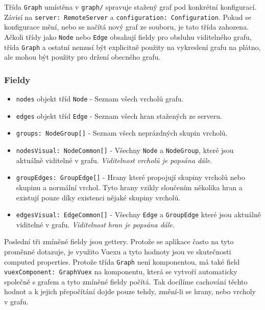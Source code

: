 Třída \texttt{Graph} umístěna v \texttt{graph/} spravuje stažený graf pod konkrétní konfigurací. Závisí na \texttt{server: RemoteServer} a \texttt{configuration: Configuration}. Pokud se konfigurace mění, nebo se načítá nový graf ze souboru, je tato třída zahozena. Ačkoli třídy jako \texttt{Node} nebo \texttt{Edge} obsahují fieldy pro obsluhu viditelného grafu, třída \texttt{Graph} a ostatní nemusí být explicitně použity na vykreslení grafu na plátno, ale mohou být použity pro držení obecného grafu.

\subsubsection*{Fieldy}
\begin{itemize}
  \item \texttt{nodes} objekt tříd \texttt{Node} - Seznam všech vrcholů grafu.
  \item \texttt{edges} objekt tříd \texttt{Edge} - Seznam všech hran stažených ze serveru.
  \item \texttt{groups: NodeGroup[]} - Seznam všech neprázdných skupin vrcholů.
  \item \texttt{nodesVisual: NodeCommon[]} - Všechny \texttt{Node} a \texttt{NodeGroup}, které jsou aktuálně viditelné v grafu. \textit{Viditelnost vrcholů je popsána dále.}
  \item \texttt{groupEdges: GroupEdge[]} - Hrany které propojují skupiny vrcholů nebo skupinu a normální vrchol. Tyto hrany vzikly sloučením několika hran a existují pouze díky existenci nějaké skupiny vrcholů.
  \item \texttt{edgesVisual: EdgeCommon[]} - Všechny \texttt{Edge} a \texttt{GroupEdge} které jsou aktuálně viditelné v grafu. \textit{Viditelnost hran je popsána dále.}
\end{itemize}

Poslední tři zmíněné fieldy jsou gettery. Protože se aplikace často na tyto proměnné dotazuje, je využito Vuexu a tyto hodnoty jsou ve skutečnosti computed properties. Protože třída \texttt{Graph} není komponentou, má také field \texttt{vuexComponent: GraphVuex} na komponentu, která se vytvoří automaticky společně s grafem a tyto zmíněné fieldy počítá. Tak docílíme cachování těchto hodnot a k jejich přepočítání dojde pouze tehdy, změní-li se hrany, nebo vrcholy v grafu.

